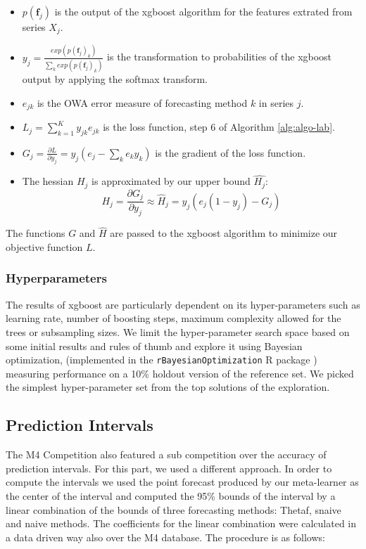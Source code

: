 \documentclass[11pt,a4paper,]{article}
\providecommand{\tightlist}{%
  \setlength{\itemsep}{0pt}\setlength{\parskip}{0pt}}
\theoremstyle{definition}
\theoremstyle{definition}
\theoremstyle{definition}
\theoremstyle{remark}
\begin{document}
\begin{itemize}
\tightlist
\item
  \(p(\bm{f}_j)\) is the output of the xgboost algorithm for the
  features extrated from series \(X_j\).
\item
  \(y_j = \frac{exp(p(\bm{f}_j)_k)}{ \sum_k exp(p(\bm{f}_j)_k)}\) is the
  transformation to probabilities of the xgboost output by applying the
  softmax transform.
\item
  \(e_{jk}\) is the OWA error measure of forecasting method \(k\) in
  series \(j\).
\item
  \(L_j = \sum_{k=1}^K y_{jk} e_{jk}\) is the loss function, step 6 of
  Algorithm \ref{alg:algo-lab}.
\item
  \(G_j = \frac{\partial{L}}{\partial{y_j}} = y_j(e_j -\sum_k e_ky_k)\)
  is the gradient of the loss function.
\item
  The hessian \(H_j\) is approximated by our upper bound \(\hat{H_j}\):
  \[ H_j = \frac{\partial{G_j}}{\partial{y_j}} \approx \hat{H}_j = y_j(e_j(1-y_j) - G_j)  \]
\end{itemize}

The functions \(G\) and \(\hat{H}\) are passed to the xgboost algorithm
to minimize our objective function \(L\).

\subsubsection{Hyperparameters}\label{hyperparameters}

The results of xgboost are particularly dependent on its
hyper-parameters such as learning rate, number of boosting steps,
maximum complexity allowed for the trees or subsampling sizes. We limit
the hyper-parameter search space based on some initial results and rules
of thumb and explore it using Bayesian optimization, (implemented in the
\texttt{rBayesianOptimization} R package
\autocite{rBayesianOptimization}) measuring performance on a 10\%
holdout version of the reference set. We picked the simplest
hyper-parameter set from the top solutions of the exploration.

\subsection{Prediction Intervals}\label{prediction-intervals}

The M4 Competition also featured a sub competition over the accuracy of
prediction intervals. For this part, we used a different approach. In
order to compute the intervals we used the point forecast produced by
our meta-learner as the center of the interval and computed the 95\%
bounds of the interval by a linear combination of the bounds of three
forecasting methods: Thetaf, snaive and naive methods. The coefficients
for the linear combination were calculated in a data driven way also
over the M4 database. The procedure is as follows:
\end{document}
